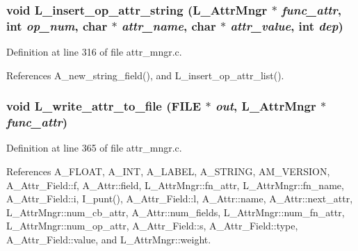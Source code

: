 \subsubsection{\setlength{\rightskip}{0pt plus 5cm}void L\_\-insert\_\-op\_\-attr\_\-string (\bf{L\_\-Attr\-Mngr} $\ast$ {\em func\_\-attr}, int {\em op\_\-num}, char $\ast$ {\em attr\_\-name}, char $\ast$ {\em attr\_\-value}, int {\em dep})}\label{attr__mngr_8h_34378ebaa293e73bad598ca574961a7f}




Definition at line 316 of file attr\_\-mngr.c.

References A\_\-new\_\-string\_\-field(), and L\_\-insert\_\-op\_\-attr\_\-list().
\subsubsection{\setlength{\rightskip}{0pt plus 5cm}void L\_\-write\_\-attr\_\-to\_\-file (FILE $\ast$ {\em out}, \bf{L\_\-Attr\-Mngr} $\ast$ {\em func\_\-attr})}\label{attr__mngr_8h_409c52cce03186e40f14eceb77f5bf52}




Definition at line 365 of file attr\_\-mngr.c.

References A\_\-FLOAT, A\_\-INT, A\_\-LABEL, A\_\-STRING, AM\_\-VERSION, A\_\-Attr\_\-Field::f, A\_\-Attr::field, L\_\-Attr\-Mngr::fn\_\-attr, L\_\-Attr\-Mngr::fn\_\-name, A\_\-Attr\_\-Field::i, I\_\-punt(), A\_\-Attr\_\-Field::l, A\_\-Attr::name, A\_\-Attr::next\_\-attr, L\_\-Attr\-Mngr::num\_\-cb\_\-attr, A\_\-Attr::num\_\-fields, L\_\-Attr\-Mngr::num\_\-fn\_\-attr, L\_\-Attr\-Mngr::num\_\-op\_\-attr, A\_\-Attr\_\-Field::s, A\_\-Attr\_\-Field::type, A\_\-Attr\_\-Field::value, and L\_\-Attr\-Mngr::weight.